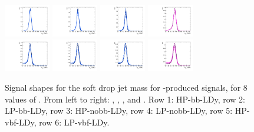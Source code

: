 \begin{figure}[htbp]
  \includegraphics[width=0.18\textwidth]{fig/analysis/templateSignalVsMX_fromDC_VBFGbuToWW_MJJ_mu_HP_vbf_DEtaLo.pdf}
  \includegraphics[width=0.18\textwidth]{fig/analysis/templateSignalVsMX_fromDC_VBFRadToWW_MJJ_mu_HP_vbf_DEtaLo.pdf}
  \includegraphics[width=0.18\textwidth]{fig/analysis/templateSignalVsMX_fromDC_VBFZprToWW_MJJ_mu_HP_vbf_DEtaLo.pdf}
  \includegraphics[width=0.18\textwidth]{fig/analysis/templateSignalVsMX_fromDC_VBFWprToWZ_MJJ_mu_HP_vbf_DEtaLo.pdf}\\
  \includegraphics[width=0.18\textwidth]{fig/analysis/templateSignalVsMX_fromDC_VBFGbuToWW_MJJ_mu_LP_vbf_DEtaLo.pdf}
  \includegraphics[width=0.18\textwidth]{fig/analysis/templateSignalVsMX_fromDC_VBFRadToWW_MJJ_mu_LP_vbf_DEtaLo.pdf}
  \includegraphics[width=0.18\textwidth]{fig/analysis/templateSignalVsMX_fromDC_VBFZprToWW_MJJ_mu_LP_vbf_DEtaLo.pdf}
  \includegraphics[width=0.18\textwidth]{fig/analysis/templateSignalVsMX_fromDC_VBFWprToWZ_MJJ_mu_LP_vbf_DEtaLo.pdf}\\
  \caption{
    Signal shapes for the soft drop jet mass \MJ for \VBF-produced signals, for 8 values of \MX.
    From left to right: \GBulktoWW, \RadtoWW, \ZprtoWW, and \WprtoWZ.
    Row 1: HP-bb-LDy, row 2: LP-bb-LDy, row 3: HP-nobb-LDy, row 4: LP-nobb-LDy, row 5: HP-vbf-LDy, row 6: LP-vbf-LDy.
  }
  \label{fig:MJJShapes_VBF_LDy_Run2}
\end{figure}

